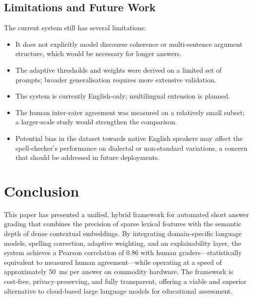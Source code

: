 \documentclass[11pt,a4paper]{article}
\begin{document}
\subsection{Limitations and Future Work}
\label{sec:limitations}
The current system still has several limitations:
\begin{itemize}[noitemsep]
\item It does not explicitly model discourse coherence or multi‑sentence argument structure, which would be necessary for longer answers.
\item The adaptive thresholds and weights were derived on a limited set of prompts; broader generalisation requires more extensive validation.
\item The system is currently English‑only; multilingual extension is planned.
\item The human inter‑rater agreement was measured on a relatively small subset; a larger‑scale study would strengthen the comparison.
\item Potential bias in the dataset towards native English speakers may affect the spell‑checker's performance on dialectal or non‑standard variations, a concern that should be addressed in future deployments.
\end{itemize}

\section{Conclusion}
\label{sec:conclusion}
This paper has presented a unified, hybrid framework for automated short answer grading that combines the precision of sparse lexical features with the semantic depth of dense contextual embeddings. By integrating domain‑specific language models, spelling correction, adaptive weighting, and an explainability layer, the system achieves a Pearson correlation of $0.86$ with human graders---statistically equivalent to measured human agreement---while operating at a speed of approximately 50~ms per answer on commodity hardware. The framework is cost‑free, privacy‑preserving, and fully transparent, offering a viable and superior alternative to cloud‑based large language models for educational assessment.

\end{document}
